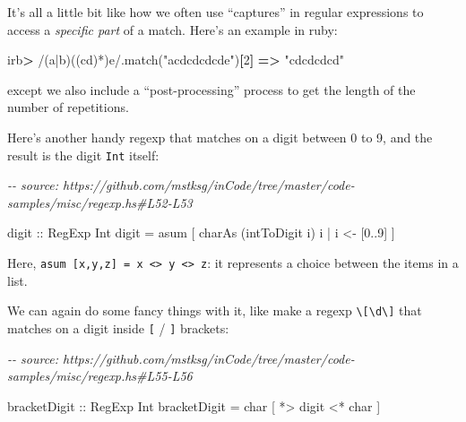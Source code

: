 \documentclass[]{article}
\newenvironment{Shaded}{}{}
\newcommand{\AttributeTok}[1]{\textcolor[rgb]{0.49,0.56,0.16}{#1}}
\newcommand{\CharTok}[1]{\textcolor[rgb]{0.25,0.44,0.63}{#1}}
\newcommand{\CommentTok}[1]{\textcolor[rgb]{0.38,0.63,0.69}{\textit{#1}}}
\newcommand{\DataTypeTok}[1]{\textcolor[rgb]{0.56,0.13,0.00}{#1}}
\newcommand{\DecValTok}[1]{\textcolor[rgb]{0.25,0.63,0.44}{#1}}
\newcommand{\FunctionTok}[1]{\textcolor[rgb]{0.02,0.16,0.49}{#1}}
\newcommand{\KeywordTok}[1]{\textcolor[rgb]{0.00,0.44,0.13}{\textbf{#1}}}
\newcommand{\NormalTok}[1]{#1}
\newcommand{\OperatorTok}[1]{\textcolor[rgb]{0.40,0.40,0.40}{#1}}
\newcommand{\OtherTok}[1]{\textcolor[rgb]{0.00,0.44,0.13}{#1}}
\newcommand{\SpecialStringTok}[1]{\textcolor[rgb]{0.73,0.40,0.53}{#1}}
\newcommand{\StringTok}[1]{\textcolor[rgb]{0.25,0.44,0.63}{#1}}
\begin{document}
It's all a little bit like how we often use ``captures'' in regular expressions
to access a \emph{specific part} of a match. Here's an example in ruby:

\begin{Shaded}
\begin{Highlighting}[]
\NormalTok{irb}\KeywordTok{\textgreater{}} \SpecialStringTok{/(a|b)((cd)*)e/}\AttributeTok{.match}\NormalTok{(}\StringTok{"acdcdcdcde"}\NormalTok{)}\KeywordTok{[}\DecValTok{2}\KeywordTok{]}
\KeywordTok{=\textgreater{}} \StringTok{"cdcdcdcd"}
\end{Highlighting}
\end{Shaded}

except we also include a ``post-processing'' process to get the length of the
number of repetitions.

Here's another handy regexp that matches on a digit between 0 to 9, and the
result is the digit \texttt{Int} itself:

\begin{Shaded}
\begin{Highlighting}[]
\CommentTok{{-}{-} source: https://github.com/mstksg/inCode/tree/master/code{-}samples/misc/regexp.hs\#L52{-}L53}

\OtherTok{digit ::} \DataTypeTok{RegExp} \DataTypeTok{Int}
\NormalTok{digit }\OtherTok{=}\NormalTok{ asum [ charAs (}\FunctionTok{intToDigit}\NormalTok{ i) i }\OperatorTok{|}\NormalTok{ i }\OtherTok{\textless{}{-}}\NormalTok{ [}\DecValTok{0}\OperatorTok{..}\DecValTok{9}\NormalTok{] ]}
\end{Highlighting}
\end{Shaded}

Here,
\texttt{asum\ {[}x,y,z{]}\ =\ x\ \textless{}\textbar{}\textgreater{}\ y\ \textless{}\textbar{}\textgreater{}\ z}:
it represents a choice between the items in a list.

We can again do some fancy things with it, like make a regexp
\texttt{\textbackslash{}{[}\textbackslash{}d\textbackslash{}{]}} that matches on
a digit inside \texttt{{[}} / \texttt{{]}} brackets:

\begin{Shaded}
\begin{Highlighting}[]
\CommentTok{{-}{-} source: https://github.com/mstksg/inCode/tree/master/code{-}samples/misc/regexp.hs\#L55{-}L56}

\OtherTok{bracketDigit ::} \DataTypeTok{RegExp} \DataTypeTok{Int}
\NormalTok{bracketDigit }\OtherTok{=}\NormalTok{ char }\CharTok{\textquotesingle{}[\textquotesingle{}} \OperatorTok{*\textgreater{}}\NormalTok{ digit }\OperatorTok{\textless{}*}\NormalTok{ char }\CharTok{\textquotesingle{}]\textquotesingle{}}
\end{Highlighting}
\end{Shaded}
\end{document}
